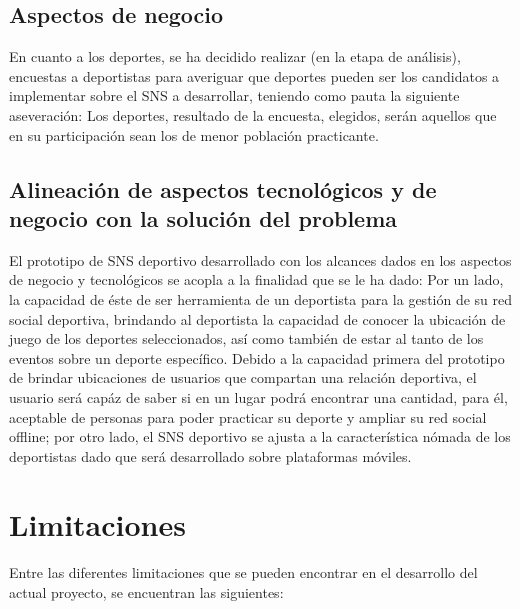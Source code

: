 \subsection{Aspectos de negocio}

En cuanto a los deportes, se ha decidido realizar (en la etapa de análisis), encuestas a deportistas para averiguar que deportes pueden ser los candidatos a implementar sobre el SNS a desarrollar, teniendo como pauta la siguiente aseveración: Los deportes, resultado de la encuesta, elegidos, serán aquellos que en su participación sean los de menor población practicante.

\subsection{Alineación de aspectos tecnológicos y de negocio con la solución del problema}

El prototipo de SNS deportivo desarrollado con los alcances dados en los aspectos de negocio y tecnológicos se acopla a la finalidad que se le ha dado: Por un lado, la capacidad de éste de ser herramienta de un deportista para la gestión de su red social deportiva, brindando al deportista la capacidad de conocer la ubicación de juego de los deportes seleccionados, así como también de estar al tanto de los eventos sobre un deporte específico. Debido a la capacidad primera del prototipo de brindar ubicaciones de usuarios que compartan una relación deportiva, el usuario será capáz de saber si en un lugar podrá encontrar una cantidad, para él, aceptable de personas para poder practicar su deporte y ampliar su red social offline; por otro lado, el SNS deportivo se ajusta a la característica nómada de los deportistas dado que será desarrollado sobre plataformas móviles.

\section{Limitaciones}

Entre las diferentes limitaciones que se pueden encontrar en el desarrollo del actual proyecto, se encuentran las siguientes:

